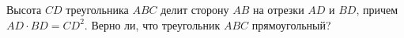 \begin{ex}
	\begin{condition}
		Высота \( CD  \) треугольника \( ABC  \) делит сторону \( AB  \) на	отрезки \( AD  \) и \( BD \), причем \( AD \cdot BD = CD^2 \). Верно ли, что треугольник \( ABC  \) прямоугольный?
	\end{condition}
\end{ex}
